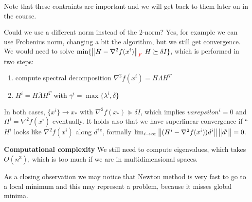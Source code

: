 \documentclass[computationalMathematics.tex]{subfiles}
\begin{document}
\begin{obs}
   Note that these contraints are important and we will get back to them later on in the course.
\end{obs}
 
Could we use a different norm instead of the $2$-norm? Yes, for example we can use Frobenius norm, changing a bit the algorithm, but we still get convergence. We would need to solve $\min \{{\left\lVert H - \nabla^2 f(x^i)\right\rVert}_{{\color{red} F}} ~ H \succeq \delta I\}$, which is performed in two steps:
\begin{enumerate}
  \item compute spectral decomposition $\nabla^2 f(x^i) = H \Lambda H^T$
  \item $H^i = H \bar{\Lambda} H^T$ with $\bar{\gamma}^i = \max \{\lambda^i, \delta\}$
\end{enumerate}
In both cases, $\{x^i\} \to x_*$ with $\nabla^2 f(x_*) \succeq \delta I$, which implies $varepsilon^i = 0$ and $H^i = \nabla^2 f(x^i)$ eventually. It holds also that we have superlinear convergence if ``$H^i$ looks like $\nabla^2 f(x^i)$ along $d^i$'', formally $\lim_{i \to \infty} \left\lVert(H^i - \nabla^2 f(x^i)) d^i\right\rVert \left\lVert d^i\right\rVert = 0$.

\begin{myframe}{\bf Computational complexity}
We still need to compute eigenvalues, which takes $O(n^3)$, which is too much if we are in multidimensional spaces.
\end{myframe}

As a closing observation we may notice that Newton method is very fast to go to a local minimum and this may represent a problem, because it misses global minima.
\end{document}
